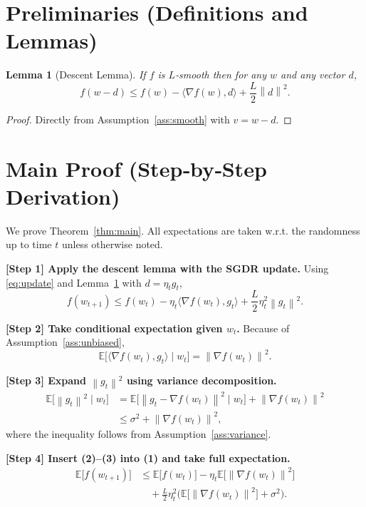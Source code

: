 \documentclass[11pt]{article}
\newtheorem{lemma}{Lemma}
\newcommand{\E}{\mathbb{E}}
\newcommand{\norm}[1]{\left\lVert #1 \right\rVert}
\newcommand{\ip}[2]{\langle #1,#2\rangle}
\begin{document}
\newpage
\section*{Preliminaries (Definitions and Lemmas)}
\begin{lemma}[Descent Lemma]\label{lem:descent}
If $f$ is $L$‑smooth then for any $w$ and any vector $d$,
\[
f(w-d)\le f(w)-\ip{\nabla f(w)}{d}+\frac{L}{2}\norm{d}^2 .
\]
\end{lemma}
\begin{proof}
Directly from Assumption~\ref{ass:smooth} with $v=w-d$.
\end{proof}

\section*{Main Proof (Step‑by‑Step Derivation)}
We prove Theorem~\ref{thm:main}.  All expectations are taken w.r.t. the
randomness up to time $t$ unless otherwise noted.

\bigskip
\noindent\textbf{[Step 1] Apply the descent lemma with the SGDR update.}  
Using \eqref{eq:update} and Lemma~\ref{lem:descent} with $d=\eta_t g_t$,
\[
f(w_{t+1})\le
f(w_t)-\eta_t\ip{\nabla f(w_t)}{g_t}
+\frac{L}{2}\eta_t^{2}\norm{g_t}^{2}. \tag{1}
\]

\noindent\textbf{[Step 2] Take conditional expectation given $w_t$.}  
Because of Assumption~\ref{ass:unbiased},
\[
\E\!\bigl[\ip{\nabla f(w_t)}{g_t}\mid w_t\bigr]
= \norm{\nabla f(w_t)}^{2}. \tag{2}
\]

\noindent\textbf{[Step 3] Expand $\norm{g_t}^{2}$ using variance decomposition.}  
\[
\begin{aligned}
\E\!\bigl[\norm{g_t}^{2}\mid w_t\bigr]
&= \E\!\bigl[\norm{g_t-\nabla f(w_t)}^{2}\mid w_t\bigr]
   +\norm{\nabla f(w_t)}^{2}   \\
&\le \sigma^{2}+ \norm{\nabla f(w_t)}^{2} ,
\end{aligned} \tag{3}
\]
where the inequality follows from Assumption~\ref{ass:variance}.

\noindent\textbf{[Step 4] Insert (2)–(3) into (1) and take full expectation.}
\[
\begin{aligned}
\E\bigl[f(w_{t+1})\bigr]
&\le \E\bigl[f(w_t)\bigr]
   -\eta_t \E\!\bigl[\norm{\nabla f(w_t)}^{2}\bigr] \\
&\quad +\frac{L}{2}\eta_t^{2}
   \bigl(\E\!\bigl[\norm{\nabla f(w_t)}^{2}\bigr]+\sigma^{2}\bigr).
\end{aligned} \tag{4}
\]
\end{document}
